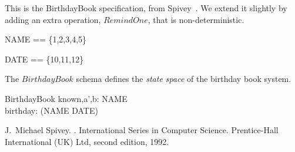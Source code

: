 \documentclass{article}
\begin{document}
This is the BirthdayBook specification, from 
Spivey~\cite{spivey:z-notation2}.  We extend it slightly
by adding an extra operation, $RemindOne$, that is non-deterministic.

\begin{zed}
   NAME == \{1,2,3,4,5\}
\end{zed}
\begin{zed}
   DATE == \{10,11,12\}
\end{zed}

The $BirthdayBook$ schema defines the \emph{state space} of 
the birthday book system. 

\begin{schema}{BirthdayBook}
    known,a',b: \power NAME \\
    birthday: \power (NAME \cross DATE)  
\end{schema}



\begin{thebibliography}{1}
J.~Michael Spivey.
.
\newblock International Series in Computer Science. Prentice-Hall International
  (UK) Ltd, second edition, 1992.
\end{thebibliography}
\end{document}
